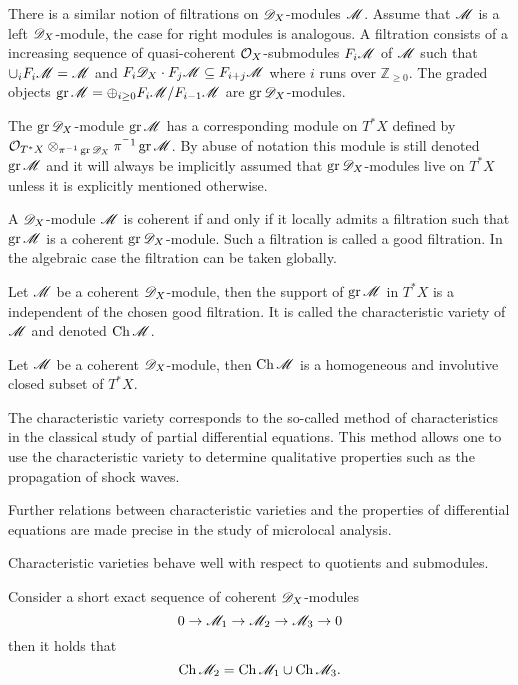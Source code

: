There is a similar notion of filtrations on $\mathscr{D}_X$-modules $\mathscr{M}$.
Assume that $\mathscr{M}$ is a left $\mathscr{D}_X$-module, the case for right modules is analogous.
A filtration consists of a increasing sequence of quasi-coherent $\mathcal{O}_X$-submodules $F_i\mathscr{M}$ of $\mathscr{M}$ such that $\cup_i F_i \mathscr{M} = \mathscr{M}$ and $F_i\mathscr{D}_X \cdot F_j\mathscr{M} \subseteq F_{i+j}\mathscr{M}$ where $i$ runs over $\mathbb{Z}_{\geq 0}$.
The graded objects $\operatorname{gr}\mathscr{M} = \oplus_{i\geq 0} F_i\mathscr{M}/F_{i-1}\mathscr{M}$ are $\operatorname{gr}\mathscr{D}_X$-modules.

The $\operatorname{gr}\mathscr{D}_X$-module $\operatorname{gr}\mathscr{M}$ has a corresponding module on $T^* X$ defined by $\mathcal{O}_{T^*X} \otimes_{\pi^{-1}\operatorname{gr} \mathscr{D}_X} \pi^{^-1}\operatorname{gr}\mathscr{M}$.
By abuse of notation this module is still denoted $\operatorname{gr}\mathscr{M}$ and it will always be implicitly assumed that $\operatorname{gr} \mathscr{D}_X$-modules live on $T^*X$ unless it is explicitly mentioned otherwise.
\begin{proposition}{\cite[Theorem 2.1.3., Section 4.1 ]{hotta2007d}}\label{prop: GoodFiltration}
  A $\mathscr{D}_X$-module $\mathscr{M}$ is coherent if and only if it locally admits a filtration such that $\operatorname{gr} \mathscr{M}$ is a coherent $\operatorname{gr} \mathscr{D}_X$-module. Such a filtration is called a good filtration. In the algebraic case the filtration can be taken globally.
\end{proposition}
\begin{proposition}{\cite[Theorem 2.2.1.]{hotta2007d}}
  Let $\mathscr{M}$ be a coherent $\mathscr{D}_X$-module, then the support of $\operatorname{gr}\mathscr{M}$ in $T^* X$ is a independent of the chosen good filtration. It is called the characteristic variety of $\mathscr{M}$ and denoted $\operatorname{Ch} \mathscr{M}$.
\end{proposition}
\begin{proposition}{\cite[Theorem 2.3.1,  2]{hotta2007d}}\label{prop: StructureChVar}
  Let $\mathscr{M}$ be a coherent $\mathscr{D}_X$-module, then $\operatorname{Ch} \mathscr{M}$ is a homogeneous and involutive closed subset of $T^* X$.
\end{proposition}
\begin{remark}
  The characteristic variety corresponds to the so-called method of characteristics in the classical study of partial differential equations.
  This method allows one to use the characteristic variety to determine qualitative properties such as the propagation of shock waves.

  Further relations between characteristic varieties and the properties of differential equations are made precise in the study of microlocal analysis.
\end{remark}
Characteristic varieties behave well with respect to quotients and submodules.
\begin{proposition}\label{prop: SESBehaviourChar}
  Consider a short exact sequence of coherent $\mathscr{D}_X$-modules
  $$0 \to \mathscr{M}_1 \to \mathscr{M}_2 \to \mathscr{M}_3 \to 0 $$
  then it holds that
  $$\operatorname{Ch} \mathscr{M}_2 = \operatorname{Ch} \mathscr{M}_1 \cup \operatorname{Ch} \mathscr{M}_3. $$
\end{proposition}
